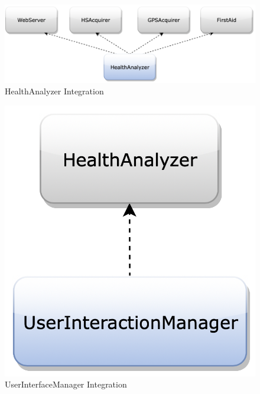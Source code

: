 \begin{figure}[H]
\centering
\includegraphics[scale=0.35]{Images/IntegrationPlanImages/fig11.png}
\caption{HealthAnalyzer Integration}
\vspace{0.8cm}
\end{figure}
\bigbreak
\begin{figure}[H]
\begin{center}
        \begin{minipage}[c]{.40\textwidth}
	\centering
\includegraphics[scale=0.35,valign=t]{Images/IntegrationPlanImages/fig12.png}
\caption{UserInterfaceManager Integration}
        \end{minipage}%
        \hspace{10mm}%
        \begin{minipage}[c]{.40\textwidth}
	\centering

\end{minipage}
\end{center}
\end{figure}
